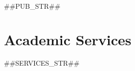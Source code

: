 \documentclass[letterpaper,11pt]{article}
\newcommand{\resumeSubHeadingListStart}{\begin{itemize}[leftmargin=*]}
\newcommand{\resumeSubHeadingListEnd}{\end{itemize}}
\begin{document}
##PUB_STR##


%
\section{Academic Services}
\begin{itemize}[itemsep=0mm, topsep=2mm, leftmargin=*]
##SERVICES_STR##
\end{itemize}



\end{document}
